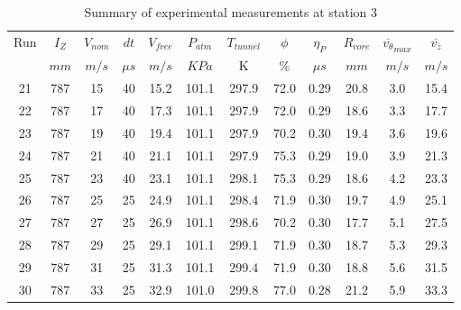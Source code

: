\begin{table}[H]
\begin{center}
\begin{tabular}{|cccccccccccc|}
	\hline
	Run & $I_Z$ & $V_{nom}$ & $dt$ & $V_{free}$ & $P_{atm}$ & $T_{tunnel}$ & $\phi$ & $\eta_P$ & $R_{core}$ & $\overline{v_{\theta}}_{max}$ & $\overline{v_{\bar{z}}}$\\
	  & $mm$ & $m/s$ & $\mu s$ & $m/s$ & $KPa$ & K & $\%$ & $\mu s$ & $mm$ & $m/s$ & $m/s$\\
	\hline
	21 & 787 & 15 & 40 & 15.2 & 101.1 & 297.9 & 72.0 & 0.29 & 20.8 & 3.0 & 15.4\\
	22 & 787 & 17 & 40 & 17.3 & 101.1 & 297.9 & 72.0 & 0.29 & 18.6 & 3.3 & 17.7\\
	23 & 787 & 19 & 40 & 19.4 & 101.1 & 297.9 & 70.2 & 0.30 & 19.4 & 3.6 & 19.6\\
	24 & 787 & 21 & 40 & 21.1 & 101.1 & 297.9 & 75.3 & 0.29 & 19.0 & 3.9 & 21.3\\
	25 & 787 & 23 & 40 & 23.1 & 101.1 & 298.1 & 75.3 & 0.29 & 18.6 & 4.2 & 23.3\\
	26 & 787 & 25 & 25 & 24.9 & 101.1 & 298.4 & 71.9 & 0.30 & 19.7 & 4.9 & 25.1\\
	27 & 787 & 27 & 25 & 26.9 & 101.1 & 298.6 & 70.2 & 0.30 & 17.7 & 5.1 & 27.5\\
	28 & 787 & 29 & 25 & 29.1 & 101.1 & 299.1 & 71.9 & 0.30 & 18.7 & 5.3 & 29.3\\
	29 & 787 & 31 & 25 & 31.3 & 101.1 & 299.4 & 71.9 & 0.30 & 18.8 & 5.6 & 31.5\\
	30 & 787 & 33 & 25 & 32.9 & 101.0 & 299.8 & 77.0 & 0.28 & 21.2 & 5.9 & 33.3\\
	\hline
\end{tabular}
\caption{Summary of experimental measurements at station 3}
\label{table:experiment_results_3}
\end{center}
\end{table}

